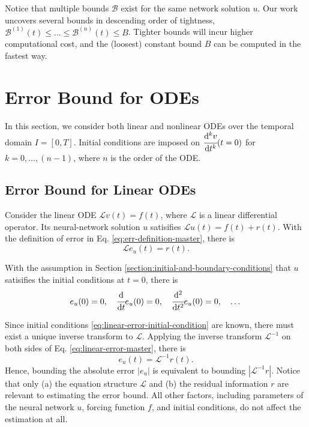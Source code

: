 \documentclass{article}
\newcommand{\dt}[1]{\cfrac{\mathrm{d} #1}{\mathrm{d} t}}
\newcommand{\dnt}[2]{\cfrac{\mathrm{d}^{#1} #2}{\mathrm{d} t^{#1}}}
\newcommand{\Err}{e}
\newcommand{\Bound}{\mathcal{B}}
\renewcommand{\L}{\mathcal{L}}
\begin{document}
    Notice that multiple bounds $\Bound$ exist for the same network solution $u$.
    Our work uncovers several bounds in descending order of tightness, $\Bound^{(1)}(t) \leq \dots \leq \Bound^{(n)}(t) \leq B$. Tighter bounds will incur higher computational cost, and the (loosest) constant bound $B$ can be computed in the fastest way.


\section{Error Bound for ODEs}
    In this section, we consider both linear and nonlinear ODEs over the temporal domain $I=[0, T]$. 
    Initial conditions are imposed on $\dnt{k}v(t=0)$ for $k = 0, \dots, (n - 1)$, where $n$ is the order of the ODE.

\subsection{Error Bound for Linear ODEs}
    Consider the linear ODE $\L v(t) = f(t)$, where $\L$ is a linear differential operator. 
    Its neural-network solution $u$ satisifies $\L u(t) = f(t) + r(t)$. 
    With the definition of error in Eq. \ref{eq:err-definition-master}, there is
    \begin{equation} \label{eq:linear-error-master}
        \L \Err_u(t) = r(t).
    \end{equation}

    With the assumption in Section \ref{section:initial-and-boundary-conditions} that $u$ satisifies the initial conditions at $t=0$, there is
    \begin{equation} \label{eq:linear-error-initial-condition}
        \Err_u(0) = 0, \quad \dt{}{}\Err_u(0) = 0, \quad \dnt{2}{}\Err_u(0) = 0, \quad \dots 
    \end{equation}

    Since initial conditions \ref{eq:linear-error-initial-condition} are known, there must exist a unique inverse transform to $\L$.  Applying the inverse transform $\L^{-1}$ on both sides of Eq. \ref{eq:linear-error-master}, there is 
    \begin{equation}\label{eq:linear-error-inverse-master}
        \Err_u(t) = \L^{-1} r(t).
    \end{equation}
    Hence, bounding the absolute error $\left|\Err_u\right|$ is equivalent to bounding $\left|\L^{-1} r\right|$. 
    Notice that only (a) the equation structure $\L$ and (b) the residual information $r$ are relevant to estimating the error bound. 
    All other factors, including parameters of the neural network $u$, forcing function $f$, and initial conditions, do not affect the estimation at all.
\end{document}
